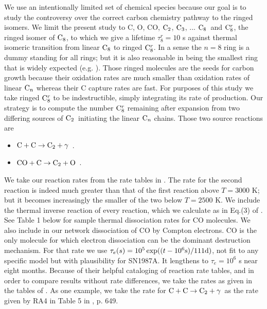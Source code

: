 \documentclass[manuscript]{aastex}
\newcommand{\ctwo}{{\rm C}_2}
\newcommand{\cthree}{{\rm C}_3}
\newcommand{\ceight}{{\rm C}_8}
\newcommand{\ceightr}{{\rm C}_8^r}
\newcommand{\cenn}{{\rm C}_n}
\newcommand{\twoctoctwo}{${\rm C} + {\rm C} \to \ctwo + \gamma$}
\newcommand{\coctoctwo}{${\rm CO} + {\rm C} \to \ctwo + {\rm O}$}
\begin{document}
We use an intentionally limited set of chemical species because our goal is
to study the controversy over the correct 
carbon chemistry pathway to the ringed isomers.
We limit the present study to C, O, CO, $\ctwo$, $\cthree$, ... $\ceight$\ and
$\ceightr$, the ringed isomer of $\ceight$, to which we give a lifetime
$\tau_8^r = 10$ s against thermal isomeric transition
from linear $\ceight$ to ringed $\ceightr$.
In a sense the $n = 8$ ring is a dummy standing for all rings; but it is also
reasonable in being the smallest ring that is widely expected 
(e.g. \citealt{doi:10.1021/j100374a025}).
Those ringed molecules are the seeds for carbon
growth because their oxidation rates are much smaller than oxidation rates of
linear $\cenn$
whereas their C capture rates are fast. 
For purposes of this study we take ringed $\ceightr$ to be
indestructible, simply integrating its rate of production.
Our strategy is
to compute the number $\ceightr$ remaining after expansion from two differing
sources of $\ctwo$\ initiating the linear $\cenn$
chains. Those two source reactions are
\begin{itemize}
\item \twoctoctwo\ \citep{1999Sci...283.1290C}.
\item \coctoctwo\ \citep{2009ApJ...703..642C,2010ApJ...713....1C}.
\end{itemize}
We take our reaction rates from the rate tables in
\citet{2009ApJ...703..642C,2010ApJ...713....1C}.
The rate for the second reaction is indeed
much greater than that of the first reaction above $T=3000$ K;
but it becomes increasingly the smaller of the two below $T=2500$ K.
We include the thermal inverse reaction of every reaction,
which we calculate as in Eq.(3) of \citet{2001ApJ...562..480C}.
See Table 1 below for sample thermal dissociation rates for CO molecules.
We also include in our network dissociation of CO by Compton electrons.
CO is the only molecule for which electron dissociation can be the dominant
destruction mechanism. For that rate we use
$\tau_e (s) = 10^5 \exp( (t-10^6{\rm s}) / 111 {\rm d} )$,
not fit to any specific model but with plausibility for SN1987A.
It lengthens to $\tau_e = 10^6$ s near eight months.
Because of their helpful cataloging of reaction rate tables,
and in order to compare results without rate differences, we take the
rates as given in the tables of
\citet{2009ApJ...703..642C,2010ApJ...713....1C}.
As one example, we take the rate for \twoctoctwo\
as the rate given by RA4 in Table 5 in \citet{2009ApJ...703..642C}, p. 649.
\end{document}
